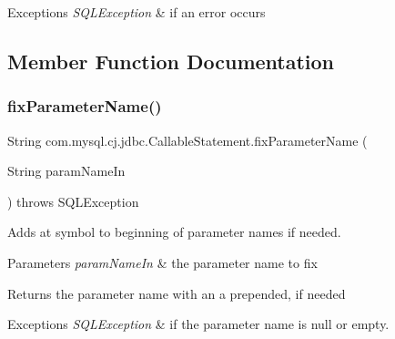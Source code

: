 \begin{DoxyExceptions}{Exceptions}
{\em S\+Q\+L\+Exception} & if an error occurs \\
\hline
\end{DoxyExceptions}


\subsection{Member Function Documentation}
\mbox{\label{classcom_1_1mysql_1_1cj_1_1jdbc_1_1_callable_statement_a1ef44aef1842ec7c4affb25b0baba1d7}} 
\subsubsection{\texorpdfstring{fix\+Parameter\+Name()}{fixParameterName()}}
{\footnotesize\ttfamily String com.\+mysql.\+cj.\+jdbc.\+Callable\+Statement.\+fix\+Parameter\+Name (\begin{DoxyParamCaption}\item[{String}]{param\+Name\+In }\end{DoxyParamCaption}) throws S\+Q\+L\+Exception\hspace{0.3cm}{\ttfamily [protected]}}

Adds \textquotesingle{}at\textquotesingle{} symbol to beginning of parameter names if needed.


\begin{DoxyParams}{Parameters}
{\em param\+Name\+In} & the parameter name to \textquotesingle{}fix\textquotesingle{}\\
\hline
\end{DoxyParams}
\begin{DoxyReturn}{Returns}
the parameter name with an \textquotesingle{}a\textquotesingle{} prepended, if needed
\end{DoxyReturn}

\begin{DoxyExceptions}{Exceptions}
{\em S\+Q\+L\+Exception} & if the parameter name is null or empty. \\
\hline
\end{DoxyExceptions}
\mbox{\label{classcom_1_1mysql_1_1cj_1_1jdbc_1_1_callable_statement_abbdda7be3e842e71327e8ea392f7a5ed}} 
